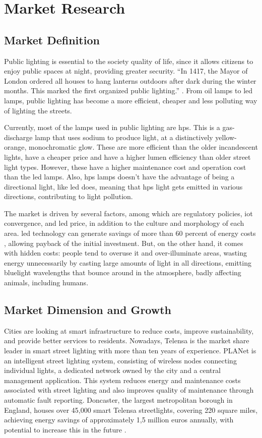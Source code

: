 \section{Market Research}
\subsection{Market Definition}
Public lighting is essential to the society quality of life, since it allows citizens to enjoy public spaces at night, providing greater security. “In 1417, the Mayor of London ordered all houses to hang lanterns outdoors after dark during the winter months. This marked the first organized public lighting.” \cite{street_lighting_history}. From oil lamps to \ac{led} lamps, public lighting has become a more efficient, cheaper and less polluting way of lighting the streets. 

Currently, most of the lamps used in public lighting are \ac{hps}. This is a gas-discharge lamp that uses sodium to produce light, at a distinctively yellow-orange, monochromatic glow. These are more efficient than the older incandescent lights, have a cheaper price and have a higher lumen efficiency than older street light types. However, these have a higher maintenance cost and operation cost than the \ac{led} lamps. Also, \ac{hps} lamps doesn’t have the advantage of being a directional light, like \ac{led} does, meaning that \ac{hps} light gets emitted in various directions, contributing to light pollution. \cite{led_vs_hps}

The market is driven by several factors, among which are regulatory policies, \ac{iot} convergence, and \ac{led} price, in addition to the culture and morphology of each area. \ac{led} technology can generate savings of more than 60 percent of energy costs \cite{light_pollution}, allowing payback of the initial investment. But, on the other hand, it comes with hidden costs: people tend to overuse it and over-illuminate areas, wasting energy unnecessarily by casting large amounts of light in all directions, emitting bluelight wavelengths that bounce around in the atmosphere, badly affecting animals, including humans.

\subsection{Market Dimension and Growth}

Cities are looking at smart infrastructure to reduce costs, improve sustainability, and provide better services to residents. Nowadays, Telensa is the market share leader in smart street lighting with more than ten years of experience. PLANet is an  intelligent street lighting system, consisting of wireless nodes connecting individual lights, a dedicated network owned by the city and a central management application. This system reduces energy and maintenance costs associated with street lighting and also improves quality of maintenance through automatic fault reporting. Doncaster, the largest metropolitan borough in England, houses over 45,000 smart Telensa streetlights, covering 220 square miles, achieving energy savings of approximately 1,5 million euros annually, with potential to increase this in the future \cite{telensa}.

